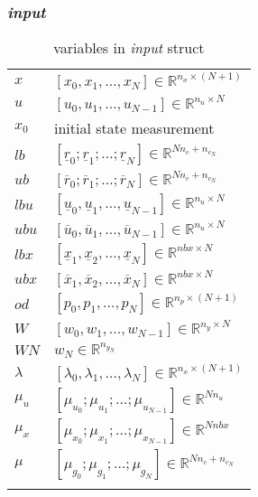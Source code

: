\documentclass{article}
\newcommand{\alert}[1]{{\textit{#1}}}
\begin{document}
\subsubsection{\alert{input}}
\begin{longtable}{l|l}
	\hline
	$x$ & $[x_0,x_1,\ldots,x_N]\in\mathbb{R}^{n_x\times (N+1)}$   \\
	$u$ & $[u_0,u_1,\ldots,u_{N-1}]\in\mathbb{R}^{n_u\times N}$ \\
	$x_0$ & initial state measurement \\
	$lb$ & $[\underline{r}_0;\underline{r}_1;\ldots;\underline{r}_{N}]\in\mathbb{R}^{Nn_c+n_{c_N}}$ \\ 
	$ub$ & $[\overline{r}_0;\overline{r}_1;\ldots;\overline{r}_{N}]\in\mathbb{R}^{Nn_c+n_{c_N}}$ \\ 
	$lbu$ & $[\underline{u}_0,\underline{u}_1,\ldots,\underline{u}_{N-1}]\in\mathbb{R}^{n_u\times N}$ \\ 
	$ubu$ & $[\overline{u}_0,\overline{u}_1,\ldots,\overline{u}_{N-1}]\in\mathbb{R}^{n_u\times N}$ \\ 
	$lbx$ & $[\underline{x}_1,\underline{x}_2,\ldots,\underline{x}_{N}]\in\mathbb{R}^{nbx\times N}$ \\ 
	$ubx$ & $[\overline{x}_1,\overline{x}_2,\ldots,\overline{x}_{N}]\in\mathbb{R}^{nbx\times N}$ \\ 
	$od$ & $[p_0, p_1, \ldots, p_N]\in\mathbb{R}^{n_p\times (N+1)}$\\
	$W$ & $[w_0, w_1, \ldots, w_{N-1}]\in\mathbb{R}^{n_y\times N}$\\
	$WN$ & $w_N\in\mathbb{R}^{n_{y_N}}$\\
	$\lambda$ & $[\lambda_0,\lambda_1,\ldots,\lambda_N]\in\mathbb{R}^{n_x\times (N+1)}$   \\
	$\mu_u$ & $[\mu_{u_0};\mu_{u_1};\ldots;\mu_{u_{N-1}}]\in\mathbb{R}^{Nn_u}$ \\
	$\mu_x$ & $[\mu_{x_0};\mu_{x_1};\ldots;\mu_{x_{N-1}}]\in\mathbb{R}^{Nnbx}$ \\
	$\mu$ & $[\mu_{g_0};\mu_{g_1};\ldots;\mu_{g_{N}}]\in\mathbb{R}^{Nn_c+n_{c_N}}$ \\
	\hline
	\caption{variables in \alert{input} struct}
	\label{table:input}
\end{longtable}
\end{document}
